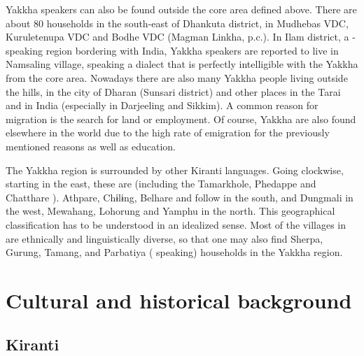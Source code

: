 Yakkha speakers can also be found outside the core area defined above. There are about 80 households in the south-east of Dhankuta district, in Mudhebas VDC, Kuruletenupa VDC and Bodhe VDC (Magman Linkha, p.c.). In Ilam district, a -speaking region bordering with India, Yakkha speakers are reported to live in Namsaling village, speaking a dialect that is perfectly intelligible with the Yakkha from the core area. Nowadays there are also many Yakkha people living outside the hills, in the city of Dharan (Sunsari district) and other places in the Tarai and in India (especially in Darjeeling and Sikkim). A common reason for migration is the search for land or employment. Of course, Yakkha are also found elsewhere in the world due to the high rate of  emigration for the previously mentioned reasons as well as education. 

The Yakkha region is surrounded by other Kiranti languages. Going clockwise, starting in the east, these are  (including the Tamarkhole, Phedappe  and Chatthare ). Athpare,  Chɨlɨng, Belhare and  follow in the south,  and Dungmali in the west, Mewahang, Lohorung and Yamphu in the north. This geographical classification has to be understood in an idealized sense. Most of the villages in  are ethnically and linguistically diverse, so that one may also find Sherpa, Gurung, Tamang,  and Parbatiya ( speaking) households in the Yakkha region.

  

\section{Cultural and historical background}\label{cult-hist}

\subsection{Kiranti}


